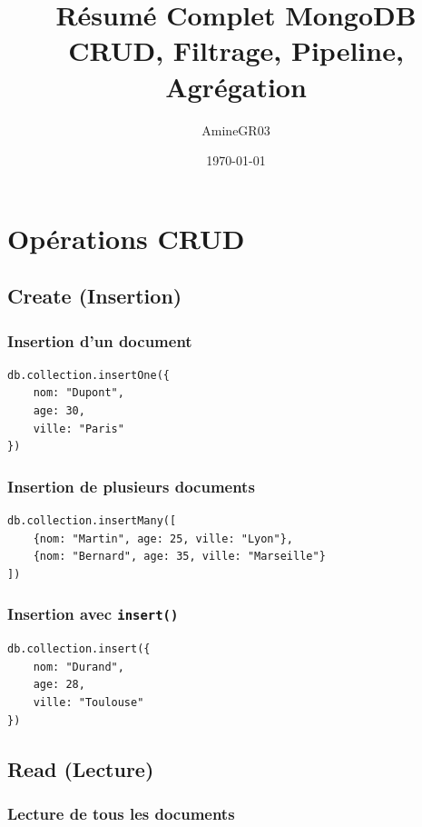 \documentclass[11pt,a4paper]{article}
\title{Résumé Complet MongoDB\\
\large CRUD, Filtrage, Pipeline, Agrégation}
\author{AmineGR03}
\date{\today}
\begin{document}
\maketitle

\tableofcontents
\newpage

\section{Opérations CRUD}

\subsection{Create (Insertion)}

\subsubsection{Insertion d'un document}

\begin{lstlisting}
db.collection.insertOne({
    nom: "Dupont",
    age: 30,
    ville: "Paris"
})
\end{lstlisting}

\subsubsection{Insertion de plusieurs documents}

\begin{lstlisting}
db.collection.insertMany([
    {nom: "Martin", age: 25, ville: "Lyon"},
    {nom: "Bernard", age: 35, ville: "Marseille"}
])
\end{lstlisting}

\subsubsection{Insertion avec \texttt{insert()}}

\begin{lstlisting}
db.collection.insert({
    nom: "Durand",
    age: 28,
    ville: "Toulouse"
})
\end{lstlisting}

\subsection{Read (Lecture)}

\subsubsection{Lecture de tous les documents}
\end{document}
